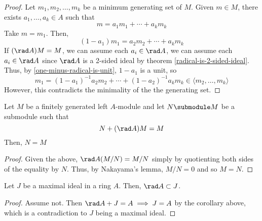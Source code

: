 \documentclass[11pt,leqno,oneside]{amsbook}
\numberwithin{thm}{section}
\begin{document}
\begin{proof}
  Let \(m_1, m_2, \ldots, m_k\) be a minimum generating set of
  \(M\). Given \(m \in M\), there exists \(a_1, \ldots, a_k \in A\)
  such that \[
    m = a_1 m_1 + \cdots + a_k m_k
  \]
  Take \(m = m_1\). Then, \[
    (1-a_1)m_1 = a_2 m_2 + \cdots + a_k m_k
  \]
  If \((\rad A) M = M\), we can assume each \(a_i \in \rad A\), we can
  assume each \(a_i \in \rad A\) since \(\rad A\) is a 2-sided ideal
  by theorem \ref{radical-is-2-sided-ideal}. Thus, by
  \ref{one-minus-radical-is-unit}, \(1-a_1\) is a unit, so \[
    m_1 = (1-a_1)^{-1} a_2 m_2 + \cdots + (1-a_2)^{-1} a_k m_k \in
    \langle m_2, \ldots, m_k \rangle
  \]
  However, this contradicts the minimality of the the generating set.
\end{proof}
\begin{cor}
  Let \(M\) be a finitely generated left \(A\)-module and let \(N
  \submodule M\) be a submodule such that \[
    N+(\rad A)M = M
  \]
  Then, \(N = M\)
\end{cor}
\begin{proof}
  Given the above, \(\rad A(M/N) = M/N\) simply by quotienting both
  sides of the equality by \(N\). Thus, by Nakayama's lemma, \(M/N =
  0\) and so \(M=N\).
\end{proof}
\begin{cor}
  Let \(J\) be a maximal ideal in a ring \(A\). Then, \(\rad A \subset
  J\).
\end{cor}
\begin{proof}
  Assume not. Then \(\rad A + J = A \implies J = A\) by the corollary
  above, which is a contradiction to \(J\) being a maximal ideal.
\end{proof}
\end{document}

